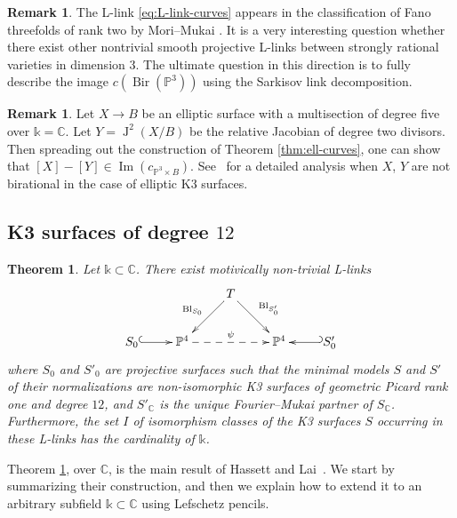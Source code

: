 \documentclass[a4paper,12pt]{amsart}
\def\C{\mathbb C}
\def\k{\mathbb k}
\def\P{\mathbb P}
\def\Image{{\operatorname{Im}}}
\def\Bl{{\operatorname{Bl}}}
\def\Bir{{\operatorname{Bir}}}
\def\Jac{{\operatorname{J}}}
\theoremstyle{plain}
\newtheorem{theorem}[dummy]{Theorem}
\numberwithin{equation}{section}
\theoremstyle{definition}
\newtheorem{remark}[dummy]{Remark}
\renewcommand{\(}{\left(}
\renewcommand{\)}{\right)}
\begin{document}
\begin{remark}
The L-link \eqref{eq:L-link-curves} appears in the classification
of Fano threefolds of rank two by Mori--Mukai \cite[2) on page 117]{Mori-Mukai}.
It is a very interesting question whether
there exist other
nontrivial smooth projective
L-links between strongly rational varieties in dimension $3$. The ultimate
question in this direction
is to fully describe the image $c(\Bir(\P^3))$
using the Sarkisov link decomposition.
\end{remark}

\begin{remark}
Let $X \to B$ be an elliptic surface
with a multisection of degree five over $\k = \C$.
Let $Y = \Jac^2(X/B)$ be the relative Jacobian
of degree two divisors.
Then spreading out the construction
of Theorem \ref{thm:ell-curves},
one can show that
$[X] - [Y] \in \Image(c_{\P^3 \times B})$.
See~\cite{ShinderZhang}
for a detailed analysis when $X$, $Y$
are not birational in the case
of elliptic K3 surfaces.
\end{remark}


\subsection{K3 surfaces of degree $12$} 
\hfill

\begin{theorem}\label{thm:K3}
Let $\k \subset \C$.
There exist motivically 
non-trivial L-links 
\begin{equation}\label{eq:L-link-K3}
 \xymatrix{
    & & T \ar[dl]_{\Bl_{S_0}} \ar[dr]^{\Bl_{S'_0}} & & \\
    S_0 \ar@{^{(}->}[r] & \P^4 \ar@{-->}[rr]^\psi &  & \P^4 & \ar@{_{(}->}[l] S'_0\\
}
\end{equation}
where $S_0$ and $S'_0$ are projective
surfaces such that the minimal models $S$ and $S'$ of their normalizations
are non-isomorphic
K3 surfaces of geometric Picard
rank one and degree $12$, 
and $S'_\C$ is the unique Fourier--Mukai partner of $S_\C$.
Furthermore, 
the set $I$ of isomorphism classes of the K3 surfaces $S$ occurring in these L-links has the cardinality of $\k$.
\end{theorem}

Theorem \ref{thm:K3}, over $\C$,
is the main result of Hassett and Lai~\cite{HassettLai}.
We start by summarizing their construction,
and then we explain how to extend it to an arbitrary
subfield $\k \subset \C$ using Lefschetz pencils.
\end{document}
